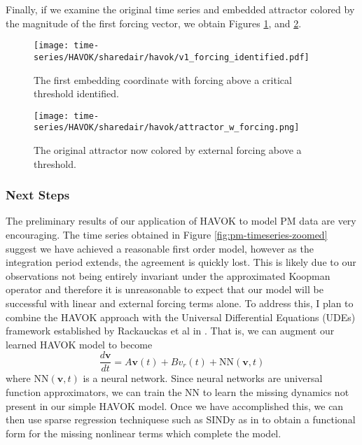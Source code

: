 Finally, if we examine the original time series and embedded attractor colored by the magnitude of the first forcing vector, we obtain Figures \ref{fig:pm-timeseries-forcing}, and \ref{fig:pm-attractor-forcing}.
\begin{figure}[h]
  \centering
  \texttt{[image: time-series/HAVOK/sharedair/havok/v1\_forcing\_identified.pdf]}
  \caption{The first embedding coordinate with forcing above a critical threshold identified.}
  \label{fig:pm-timeseries-forcing}
\end{figure}

\begin{figure}[h]
  \centering
  \texttt{[image: time-series/HAVOK/sharedair/havok/attractor\_w\_forcing.png]}
  \caption{The original attractor now colored by external forcing above a threshold.}
  \label{fig:pm-attractor-forcing}
\end{figure}


\subsubsection{Next Steps}

The preliminary results of our application of HAVOK to model PM data are very encouraging. The time series obtained in Figure \ref{fig:pm-timeseries-zoomed} suggest we have achieved a reasonable first order model, however as the integration period extends, the agreement is quickly lost. This is likely due to our observations not being entirely invariant under the approximated Koopman operator and therefore it is unreasonable to expect that our model will be successful with linear and external forcing terms alone. To address this, I plan to combine the HAVOK approach with the Universal Differential Equations (UDEs) framework established by Rackauckas et al in \cite{rackauckas2020universal}. That is, we can augment our learned HAVOK model to become
\begin{equation}
  \frac{d\mathbf{v}}{dt} = A\mathbf{v}(t) + Bv_{r}(t) + \text{NN}(\mathbf{v}, t)
\end{equation}
where $\text{NN}(\mathbf{v}, t)$ is a neural network. Since neural networks are universal function approximators, we can train the NN to learn the missing dynamics not present in our simple HAVOK model. Once we have accomplished this, we can then use sparse regression techniquese such as SINDy as in \cite{brunton-sindy} to obtain a functional form for the missing nonlinear terms which complete the model.


